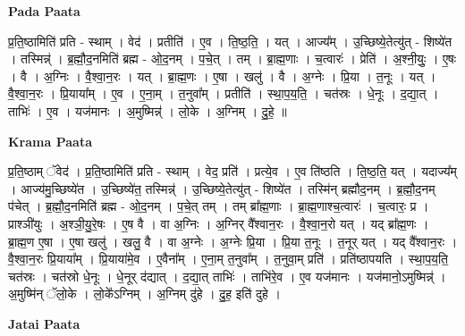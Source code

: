 \documentclass[17pt]{extarticle}
\begin{document}
\textbf{Pada Paata} \newline

प्र॒ति॒ष्ठामिति॑ प्रति - स्थाम् । वेद॑ । प्रतीति॑ । ए॒व । ति॒ष्ठ॒ति॒ । यत् । आज्य᳚म् । उ॒च्छिष्ये॒तेत्यु॑त् - शिष्ये॑त । तस्मिन्न्॑ । ब्र॒ह्मौ॒द॒नमिति॑ ब्रह्म - ओ॒द॒नम् । प॒चे॒त् । तम् । ब्रा॒ह्म॒णाः । च॒त्वारः॑ । प्रेति॑ । अ॒श्नी॒युः॒ । ए॒षः । वै । अ॒ग्निः । वै॒श्वा॒न॒रः । यत् । ब्रा॒ह्म॒णः । ए॒षा । खलु॑ । वै । अ॒ग्नेः । प्रि॒या । त॒नूः । यत् । वै॒श्वा॒न॒रः । प्रि॒याया᳚म् । ए॒व । ए॒ना॒म् । त॒नुवा᳚म् । प्रतीति॑ । स्था॒प॒य॒ति॒ । चत॑स्रः । धे॒नूः । द॒द्या॒त् । ताभिः॑ । ए॒व । यज॑मानः । अ॒मुष्मिन्न्॑ । लो॒के । अ॒ग्निम् । दु॒हे॒ ॥  \newline


\textbf{Krama Paata} \newline

प्र॒ति॒ष्ठाम् ॅवेद॑ । प्र॒ति॒ष्ठामिति॑ प्रति - स्थाम् । वेद॒ प्रति॑ । प्रत्ये॒व । ए॒व ति॑ष्ठति । ति॒ष्ठ॒ति॒ यत् । यदाज्य᳚म् । आज्य॑मु॒च्छिष्ये॑त । उ॒च्छिष्ये॑त॒ तस्मिन्न्॑ । उ॒च्छिष्ये॒तेत्यु॑त् - शिष्ये॑त । तस्मि॑न् ब्रह्मौद॒नम् । ब्र॒ह्मौ॒द॒नम् प॑चेत् । ब्र॒ह्मौ॒द॒नमिति॑ ब्रह्म - ओ॒द॒नम् । प॒चे॒त् तम् । तम् ब्रा᳚ह्म॒णाः । ब्रा॒ह्म॒णाश्च॒त्वारः॑ । च॒त्वारः॒ प्र । प्राश्ञी॑युः । अ॒श्ञी॒यु॒रे॒षः । ए॒ष वै । वा अ॒ग्निः । अ॒ग्निर् वै᳚श्वान॒रः । वै॒श्वा॒न॒रो यत् । यद् ब्रा᳚ह्म॒णः । ब्रा॒ह्म॒ण ए॒षा । ए॒षा खलु॑ । खलु॒ वै । वा अ॒ग्नेः । अ॒ग्नेः प्रि॒या । प्रि॒या त॒नूः । त॒नूर् यत् । यद् वै᳚श्वान॒रः । वै॒श्वा॒न॒रः प्रि॒याया᳚म् । प्रि॒याया॑मे॒व । ए॒वैना᳚म् । ए॒ना॒म् त॒नुवा᳚म् । त॒नुवा॒म् प्रति॑ । प्रति॑ष्ठापयति । स्था॒प॒य॒ति॒ चत॑स्रः । चत॑स्रो धे॒नूः । धे॒नूर् द॑द्यात् । द॒द्या॒त् ताभिः॑ । ताभि॑रे॒व । ए॒व यज॑मानः । यज॑मानो॒ऽमुष्मिन्न्॑ । अ॒मुष्मि॑न् ॅलो॒के । लो॒के᳚ऽग्निम् । अ॒ग्निम् दु॑हे । दु॒ह॒ इति॑ दुहे । \newline

\textbf{Jatai Paata} \newline
\end{document}

